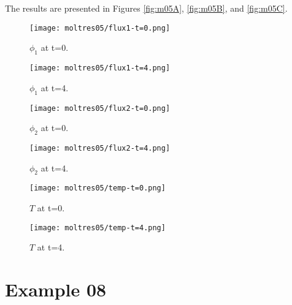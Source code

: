 \documentclass[11pt,letterpaper]{article}
\begin{document}
The results are presented in Figures \ref{fig:m05A}, \ref{fig:m05B}, and \ref{fig:m05C}.
\begin{figure*}[!h]
	\centering
	\begin{subfigure}[t]{0.4\textwidth}
		\centering
		\texttt{[image: moltres05/flux1-t=0.png]} 
		\caption{$\phi_{1}$ at t=0.}
		\label{fig:m05-flux1-1}
	\end{subfigure}
	\vspace{1cm}
	\begin{subfigure}[t]{0.4\textwidth}
		\centering
		\texttt{[image: moltres05/flux1-t=4.png]} 
		\caption{$\phi_{1}$ at t=4.}
		\label{fig:m05-flux1-5}
	\end{subfigure}
	\hfill
	\caption{Flux1.}
	\label{fig:m05A}
\end{figure*}

\begin{figure*}[!h]
	\centering
	\begin{subfigure}[t]{0.4\textwidth}
		\centering
		\texttt{[image: moltres05/flux2-t=0.png]} 
		\caption{$\phi_{2}$ at t=0.}
		\label{fig:m05-flux2-1}
	\end{subfigure}
	\vspace{1cm}
	\begin{subfigure}[t]{0.4\textwidth}
		\centering
		\texttt{[image: moltres05/flux2-t=4.png]} 
		\caption{$\phi_{2}$ at t=4.}
		\label{fig:m05-flux2-5}
	\end{subfigure}
	\hfill
	\caption{Flux2.}
	\label{fig:m05B}
\end{figure*}

\begin{figure*}[!h]
	\centering
	\begin{subfigure}[t]{0.4\textwidth}
		\centering
		\texttt{[image: moltres05/temp-t=0.png]} 
		\caption{$T$ at t=0.}
		\label{fig:m05-temp-1}
	\end{subfigure}
	\vspace{1cm}
	\begin{subfigure}[t]{0.4\textwidth}
		\centering
		\texttt{[image: moltres05/temp-t=4.png]} 
		\caption{$T$ at t=4.}
		\label{fig:m05-temp-5}
	\end{subfigure}
	\hfill
	\caption{Temperature.}
	\label{fig:m05C}
\end{figure*}

\newpage
\section{Example 08}
\end{document}
